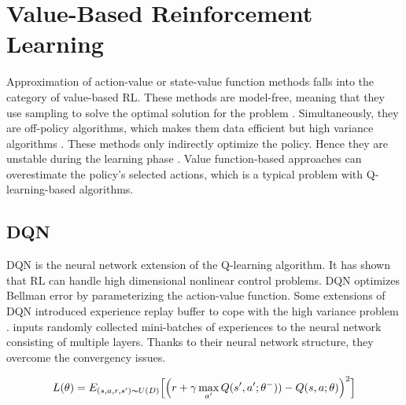 \section{Value-Based Reinforcement Learning}

Approximation of action-value or state-value function methods falls into the category of value-based RL. These methods are model-free, meaning that they use sampling to solve the optimal solution for the problem \cite{Mnih}. Simultaneously, they are off-policy algorithms, which makes them data efficient but high variance algorithms \cite{SpinningUp2018}. These methods only indirectly optimize the policy. Hence they are unstable during the learning phase \cite{Sutton2018}. Value function-based approaches can overestimate the policy's selected actions, which is a typical problem with Q-learning-based algorithms. 


\subsection{DQN}

DQN is the neural network extension of the Q-learning algorithm. It has shown that RL can handle high dimensional nonlinear control problems. DQN optimizes Bellman error by parameterizing the action-value function. Some extensions of DQN introduced experience replay buffer to cope with the high variance problem \cite{Lin1993}. \cite{Mnih}  inputs randomly collected mini-batches of experiences to the neural network consisting of multiple layers. Thanks to their neural network structure, they overcome the convergency issues.

\begin{equation}
    L(\theta) = E_{(s, a, r, s') \thicksim U(D)} \Big[\Big(r+ \gamma \max\limits_{a'}Q(s',a'; \theta^-)) - Q(s,a;\theta)\Big)^2\Big] 
\end{equation}

